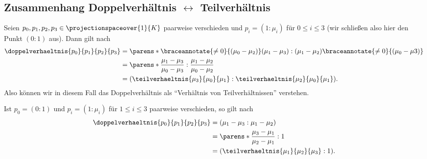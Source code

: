\subsection*{Zusammenhang Doppelverhältnis \( \leftrightarrow \) Teilverhältnis}
Seien \( p_0,p_1,p_2,p_3\in \projectionspaceover{1}{K} \) paarweise
verschieden und \( p_i=(1:\mu_i) \) für \( 0\leq i\leq 3 \) (wir schließen also hier den Punkt \( (0:1) \) aus). Dann gilt nach 
\begin{align*}
  \doppelverhaeltnis{p_0}{p_1}{p_2}{p_3}&=\parens*{\braceannotate{\neq 0}{(\mu_0-\mu_2)}(\mu_1-\mu_3):(\mu_1-\mu_2)\braceannotate{\neq 0}{(\mu_0-\mu3)}}\\
  &=\parens*{\frac{\mu_1-\mu_3}{\mu_0-\mu_3}:\frac{\mu_1-\mu_2}{\mu_0-\mu_2}}\\
  &=(\teilverhaeltnis{\mu_3}{\mu_0}{\mu_1}:\teilverhaeltnis{\mu_2}{\mu_0}{\mu_1}).
\end{align*}
Also können wir in diesem Fall das Doppelverhältnis als \enquote{Verhältnis von Teilverhältnissen} verstehen.
\begin{bemerkungen*}
  Ist \( p_0=(0:1) \) und \( p_i=(1:\mu_i) \) für \( 1\leq i\leq 3 \) paarweise verschieden, so gilt nach 
  \begin{align*}
    \doppelverhaeltnis{p_0}{p_1}{p_2}{p_3}&=(\mu_1-\mu_3:\mu_1-\mu_2)\\
    &=\parens*{\frac{\mu_3-\mu_1}{\mu_2-\mu_1}:1}\\
    &=(\teilverhaeltnis{\mu_1}{\mu_2}{\mu_3}:1).
  \end{align*}
\end{bemerkungen*}
